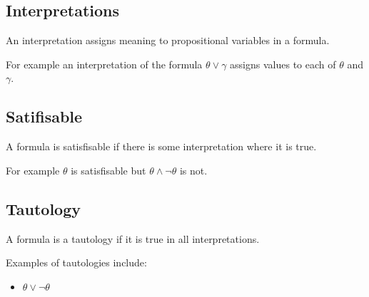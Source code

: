 \subsection{Interpretations}

An interpretation assigns meaning to propositional variables in a formula.

For example an interpretation of the formula \(\theta \lor \gamma \) assigns values to each of \(\theta \) and \(\gamma \).

\subsection{Satifisable}

A formula is satisfisable if there is some interpretation where it is true.

For example \(\theta \) is satisfisable but \(\theta \land \neg \theta \) is not.

\subsection{Tautology}

A formula is a tautology if it is true in all interpretations.

Examples of tautologies include:
\begin{itemize}
\item \(\theta \lor \neg \theta \)
\end{itemize}

